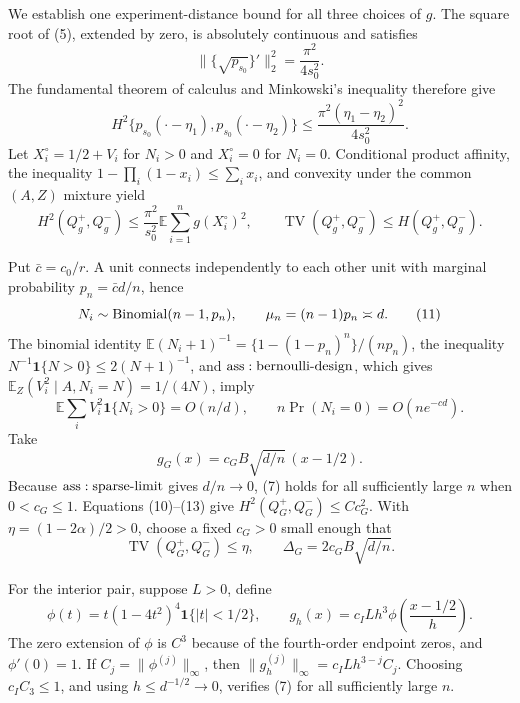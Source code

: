We establish one experiment-distance bound for all three choices of \(g\).  The square root of (5), extended by zero, is absolutely continuous and satisfies
\[
 \|\{\sqrt{p_{s_0}}\}'\|_2^2=\frac{\pi^2}{4s_0^2}.
\]
The fundamental theorem of calculus and Minkowski's inequality therefore give
\[
 H^2\{p_{s_0}(\mathord\cdot-\eta_1),p_{s_0}(\mathord\cdot-\eta_2)\}
 \leq\frac{\pi^2(\eta_1-\eta_2)^2}{4s_0^2}.
\tag{9}
\]
Let \(X_i^\circ=1/2+V_i\) for \(N_i>0\) and \(X_i^\circ=0\) for \(N_i=0\).  Conditional product affinity, the inequality \(1-\prod_i(1-x_i)\leq\sum_i x_i\), and convexity under the common \((A,Z)\) mixture yield
\[
 H^2(Q_g^+,Q_g^-)
 \leq\frac{\pi^2}{s_0^2}\mathbb E\sum_{i=1}^ng(X_i^\circ)^2,
 \qquad \operatorname{TV}(Q_g^+,Q_g^-)\leq H(Q_g^+,Q_g^-).
\tag{10}
\]

Put \(\bar c=c_0/r\).  A unit connects independently to each other unit with marginal probability \(p_n=\bar c d/n\), hence
\[
 N_i\sim{\rm Binomial}(n-1,p_n),
 \qquad \mu_n=(n-1)p_n\asymp d.
\tag{11}
\]
The binomial identity \(\mathbb E(N_i+1)^{-1}=\{1-(1-p_n)^n\}/(np_n)\), the inequality \(N^{-1}\mathbf1\{N>0\}\leq2(N+1)^{-1}\), and \({\rm ass:bernoulli\text{-}design}\), which gives \(\mathbb E_Z(V_i^2\mid A,N_i=N)=1/(4N)\), imply
\[
 \mathbb E\sum_iV_i^2\mathbf1\{N_i>0\}=O(n/d),
 \qquad n\Pr(N_i=0)=O(ne^{-cd}).
\tag{12}
\]
Take
\[
 g_G(x)=c_GB\sqrt{d/n}\,(x-1/2).
\tag{13}
\]
Because \({\rm ass:sparse\text{-}limit}\) gives \(d/n\to0\), (7) holds for all sufficiently large \(n\) when \(0<c_G\leq1\).  Equations (10)--(13) give \(H^2(Q_G^+,Q_G^-)\leq Cc_G^2\).  With \(\eta=(1-2\alpha)/2>0\), choose a fixed \(c_G>0\) small enough that
\[
 \operatorname{TV}(Q_G^+,Q_G^-)\leq\eta,
 \qquad \Delta_G=2c_GB\sqrt{d/n}.
\tag{14}
\]

For the interior pair, suppose \(L>0\), define
\[
 \phi(t)=t(1-4t^2)^4\mathbf1\{|t|<1/2\},
 \qquad g_h(x)=c_ILh^3\phi\!\left(\frac{x-1/2}{h}\right).
\tag{15}
\]
The zero extension of \(\phi\) is \(C^3\) because of the fourth-order endpoint zeros, and \(\phi'(0)=1\).  If \(C_j=\|\phi^{(j)}\|_\infty\), then \(\|g_h^{(j)}\|_\infty=c_ILh^{3-j}C_j\).  Choosing \(c_IC_3\leq1\), and using \(h\leq d^{-1/2}\to0\), verifies (7) for all sufficiently large \(n\).

